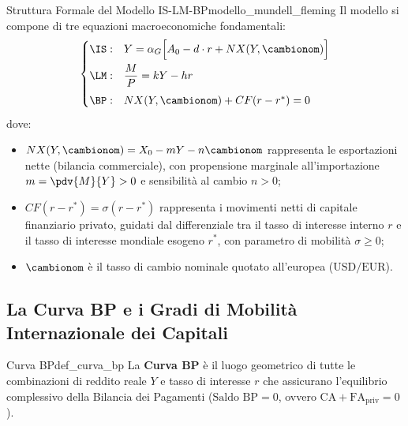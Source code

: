 \begin{modello}{Struttura Formale del Modello IS-LM-BP}{modello_mundell_fleming}
Il modello si compone di tre equazioni macroeconomiche fondamentali:
\begin{equation}
    \begin{cases}
        \IS: & Y = \alpha_G \Big[ A_0 - d \cdot r + NX(Y, \cambionom) \Big] \\[0.6em]
        \LM: & \dfrac{M}{P} = k Y - h r \\[0.8em]
        \BP: & NX(Y, \cambionom) + CF(r - r^*) = 0
    \end{cases} \label{eq:sistema_mf}
\end{equation}
dove:
\begin{itemize}
    \item $NX(Y, \cambionom) = X_0 - m Y - n \cambionom$ rappresenta le esportazioni nette (bilancia commerciale), con propensione marginale all'importazione $m = \pdv{M}{Y} > 0$ e sensibilità al cambio $n > 0$;
    \item $CF(r - r^*) = \sigma (r - r^*)$ rappresenta i movimenti netti di capitale finanziario privato, guidati dal differenziale tra il tasso di interesse interno $r$ e il tasso di interesse mondiale esogeno $r^*$, con parametro di mobilità $\sigma \ge 0$;
    \item $\cambionom$ è il tasso di cambio nominale quotato all'europea ($\text{USD/EUR}$).
\end{itemize}
\end{modello}

\subsection{La Curva BP e i Gradi di Mobilità Internazionale dei Capitali}

\begin{definizione}{Curva BP}{def_curva_bp}
La \textbf{Curva BP} è il luogo geometrico di tutte le combinazioni di reddito reale $Y$ e tasso di interesse $r$ che assicurano l'equilibrio complessivo della Bilancia dei Pagamenti ($\text{Saldo BP} = 0$, ovvero $\mathrm{CA} + \mathrm{FA}_{\text{priv}} = 0$).
\end{definizione}

